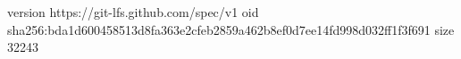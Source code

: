 version https://git-lfs.github.com/spec/v1
oid sha256:bda1d600458513d8fa363e2cfeb2859a462b8ef0d7ee14fd998d032ff1f3f691
size 32243
